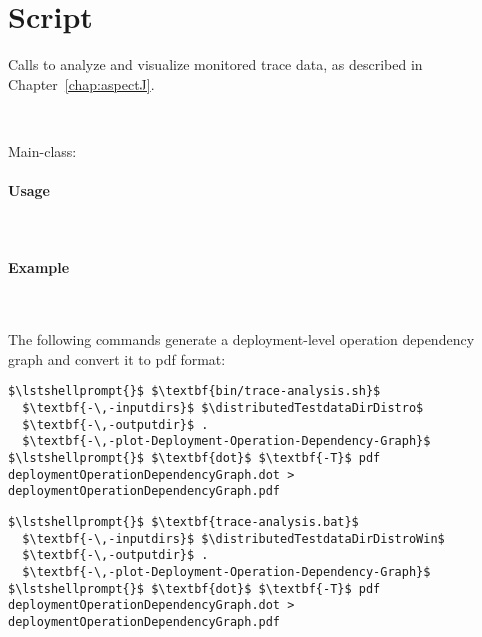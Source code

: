 \section{Script }\label{appendix:wrapperScripts:traceAnalysis}

Calls \KiekerTraceAnalysis{} to analyze and visualize monitored trace data, %
as described in Chapter~\ref{chap:aspectJ}.

\

\noindent Main-class: {\small {}}


\paragraph*{Usage}\

\enlargethispage{1cm}

\setTextListing


\paragraph*{Example}\

\noindent The following commands generate a deployment-level operation dependency 
graph and convert it to pdf format:

\enlargethispage{1cm}

\setTextListing
\begin{lstlisting}[caption=Execution under UNIX-like systems]
$\lstshellprompt{}$ $\textbf{bin/trace-analysis.sh}$
  $\textbf{-\,-inputdirs}$ $\distributedTestdataDirDistro$ 
  $\textbf{-\,-outputdir}$ . 
  $\textbf{-\,-plot-Deployment-Operation-Dependency-Graph}$
$\lstshellprompt{}$ $\textbf{dot}$ $\textbf{-T}$ pdf  deploymentOperationDependencyGraph.dot > deploymentOperationDependencyGraph.pdf
\end{lstlisting}

\begin{lstlisting}[caption=Execution under Windows]
$\lstshellprompt{}$ $\textbf{trace-analysis.bat}$
  $\textbf{-\,-inputdirs}$ $\distributedTestdataDirDistroWin$ 
  $\textbf{-\,-outputdir}$ . 
  $\textbf{-\,-plot-Deployment-Operation-Dependency-Graph}$
$\lstshellprompt{}$ $\textbf{dot}$ $\textbf{-T}$ pdf  deploymentOperationDependencyGraph.dot > deploymentOperationDependencyGraph.pdf
\end{lstlisting}

